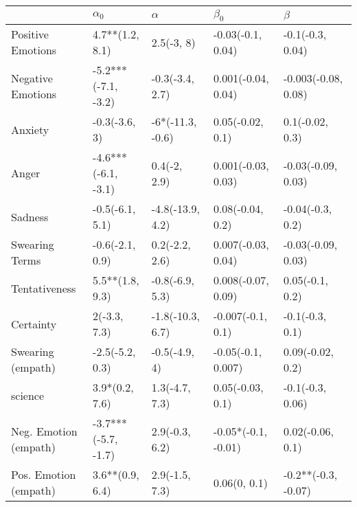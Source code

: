 \begin{tabular}{lllll}
\toprule
{} &           $\alpha_0$ &          $\alpha$ &            $\beta_0$ &              $\beta$ \\
\midrule
Positive Emotions     &      4.7**(1.2, 8.1) &        2.5(-3, 8) &    -0.03(-0.1, 0.04) &     -0.1(-0.3, 0.04) \\
Negative Emotions     &  -5.2***(-7.1, -3.2) &   -0.3(-3.4, 2.7) &   0.001(-0.04, 0.04) &  -0.003(-0.08, 0.08) \\
Anxiety               &        -0.3(-3.6, 3) &  -6*(-11.3, -0.6) &     0.05(-0.02, 0.1) &      0.1(-0.02, 0.3) \\
Anger                 &  -4.6***(-6.1, -3.1) &      0.4(-2, 2.9) &   0.001(-0.03, 0.03) &   -0.03(-0.09, 0.03) \\
Sadness               &      -0.5(-6.1, 5.1) &  -4.8(-13.9, 4.2) &     0.08(-0.04, 0.2) &     -0.04(-0.3, 0.2) \\
Swearing Terms        &      -0.6(-2.1, 0.9) &    0.2(-2.2, 2.6) &   0.007(-0.03, 0.04) &   -0.03(-0.09, 0.03) \\
Tentativeness         &      5.5**(1.8, 9.3) &   -0.8(-6.9, 5.3) &   0.008(-0.07, 0.09) &      0.05(-0.1, 0.2) \\
Certainty             &         2(-3.3, 7.3) &  -1.8(-10.3, 6.7) &    -0.007(-0.1, 0.1) &      -0.1(-0.3, 0.1) \\
Swearing (empath)     &      -2.5(-5.2, 0.3) &     -0.5(-4.9, 4) &   -0.05(-0.1, 0.007) &     0.09(-0.02, 0.2) \\
science               &       3.9*(0.2, 7.6) &    1.3(-4.7, 7.3) &     0.05(-0.03, 0.1) &     -0.1(-0.3, 0.06) \\
Neg. Emotion (empath) &  -3.7***(-5.7, -1.7) &    2.9(-0.3, 6.2) &  -0.05*(-0.1, -0.01) &     0.02(-0.06, 0.1) \\
Pos. Emotion (empath) &      3.6**(0.9, 6.4) &    2.9(-1.5, 7.3) &         0.06(0, 0.1) &  -0.2**(-0.3, -0.07) \\
\bottomrule
\end{tabular}
